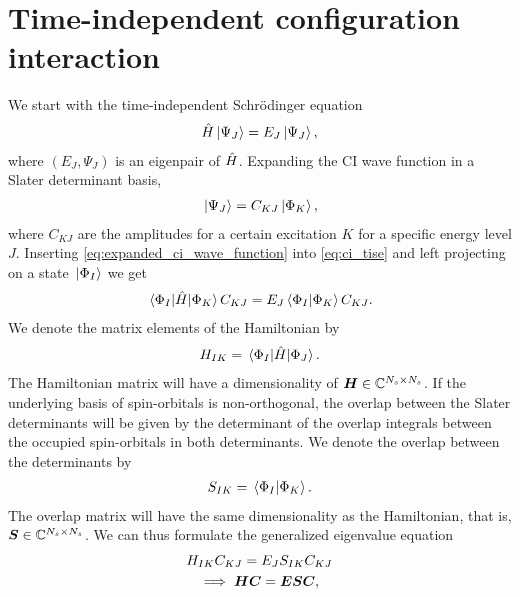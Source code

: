     \section{Time-independent configuration interaction}
        We start with the time-independent Schrödinger equation
        \begin{align}
            \hat{H}\ket*{\Psi_J} = E_J\ket*{\Psi_J},
            \label{eq:ci_tise}
        \end{align}
        where $(E_J, \Psi_J)$ is an eigenpair of $\hat{H}$.
        Expanding the CI wave function in a Slater determinant basis,
        \begin{align}
            \ket*{\Psi_J} = C_{KJ}\ket*{\Phi_K},
            \label{eq:expanded_ci_wave_function}
        \end{align}
        where $C_{KJ}$ are the amplitudes for a certain excitation $K$ for a
        specific energy level $J$.
        Inserting \autoref{eq:expanded_ci_wave_function} into
        \autoref{eq:ci_tise} and left projecting on a state $\ket*{\Phi_I}$ we
        get
        \begin{align}
            \mel*{\Phi_I}{\hat{H}}{\Phi_K}C_{KJ}
            = E_J\braket*{\Phi_I}{\Phi_K}C_{KJ}.
        \end{align}
        We denote the matrix elements of the Hamiltonian by
        \begin{align}
            H_{IK}
            = \mel*{\Phi_I}{\hat{H}}{\Phi_J}.
        \end{align}
        The Hamiltonian matrix will have a dimensionality of $\boldsymbol{H} \in
        \mathbb{C}^{N_s \times N_s}$.
        If the underlying basis of spin-orbitals is non-orthogonal, the overlap
        between the Slater determinants will be given by the determinant of the
        overlap integrals between the occupied spin-orbitals in both
        determinants.
        We denote the overlap between the determinants by
        \begin{align}
            S_{IK} = \braket*{\Phi_I}{\Phi_K}.
        \end{align}
        The overlap matrix will have the same dimensionality as the Hamiltonian,
        that is, $\boldsymbol{S} \in \mathbb{C}^{N_s \times N_s}$.
        We can thus formulate the generalized eigenvalue equation
        \begin{gather}
            H_{IK}C_{KJ} = E_J S_{IK}C_{KJ}
            \\
            \implies
            \boldsymbol{H} \boldsymbol{C} = \boldsymbol{E} \boldsymbol{S} \boldsymbol{C},
            \label{eq:ci-generalized}
        \end{gather}
